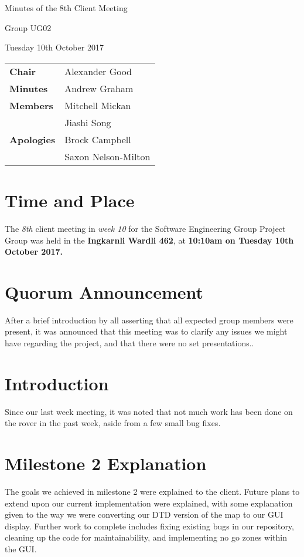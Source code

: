 \documentclass{article}
\begin{document}
\begin{center}    
{\huge Minutes of the 8th Client Meeting \par}
\vspace{0.5cm}
{\large Group UG02 \par}
\vspace{0.5cm}
{\large Tuesday 10th October 2017 \par}
\vspace{0.5cm}
\end{center}

\begin{flushleft}
\begin{tabular}{ll}
{\bfseries Chair} & Alexander Good \\
{\bfseries Minutes} & Andrew Graham \\
{\bfseries Members} & Mitchell Mickan  \\
 & Jiashi Song \\ 

{\bfseries Apologies}  & Brock Campbell \\
& Saxon Nelson-Milton \\
\end{tabular}
\end{flushleft}

\section{Time and Place}
The {\itshape 8th} client meeting in {\itshape week 10} for the Software Engineering Group Project Group was held in the {\bfseries Ingkarnli Wardli 462}, at {\bfseries 10:10am on Tuesday 10th October 2017.} 

\section{Quorum Announcement}
    After a brief introduction by all asserting that all expected group members were present, it was announced that this meeting was to clarify any issues we might have regarding the project, and that there were no set presentations.. 

\section{Introduction}
  Since our last week meeting, it was noted that not much work has been done on the rover in the past week, aside from a few small bug fixes. 

\section{Milestone 2 Explanation}
	The goals we achieved in milestone 2 were explained to the client. Future plans to extend upon our current implementation were explained, with some explanation given to the way we were converting our DTD version of the map to our GUI display. Further work to complete includes fixing existing bugs in our repository, cleaning up the code for maintainability, and implementing no go zones within the GUI.
\end{document}
